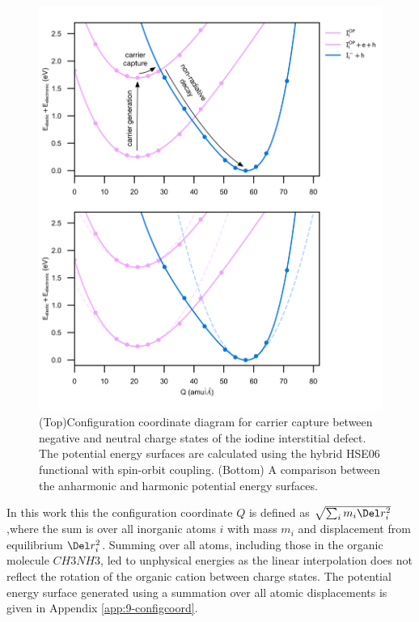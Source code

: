 \begin{figure}[h!]   
\centering
  \includegraphics[width=1.0\columnwidth]{figures/ch6/carrier_capture_digram.png}
  \caption[Configuration coordinate diagram for carrier capture between negative and neutral charge states of the iodine interstitial defect]{(Top)Configuration coordinate diagram for carrier capture between negative and neutral charge states of the iodine interstitial defect. The potential energy surfaces are calculated using the hybrid HSE06 functional with spin-orbit coupling. (Bottom) A comparison between the anharmonic and harmonic potential energy surfaces. }
\label{configuration_coordinate}
\end{figure}

In this work this the configuration coordinate $Q$ is defined as $\sqrt{\sum_i m_i \Del r_i^2}$ ,where the sum is over all inorganic atoms $i$ with mass $m_i$ and displacement from equilibrium $\Del r_i^2$. Summing over all atoms, including those in the organic molecule $CH3NH3$, led to unphysical energies as the linear interpolation does not reflect the rotation of the organic cation between charge states. The potential energy surface generated using a summation over all atomic displacements is given in Appendix \ref{app:9-configcoord}.


